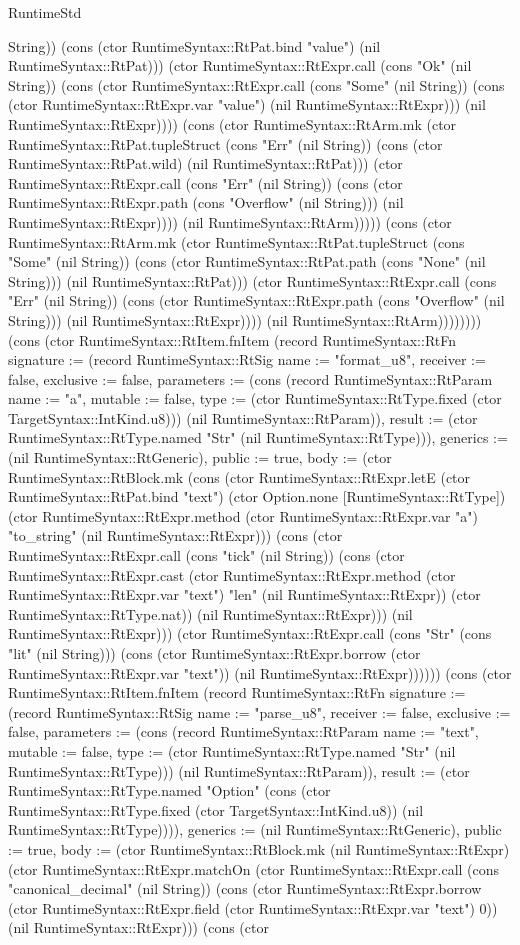 \begin{lexlean}{RuntimeStd}
\begin{semanticmodule}
{String)) (cons (ctor RuntimeSyntax::RtPat.bind "value") (nil RuntimeSyntax::RtPat))) (ctor RuntimeSyntax::RtExpr.call (cons "Ok" (nil String)) (cons (ctor RuntimeSyntax::RtExpr.call (cons "Some" (nil String)) (cons (ctor RuntimeSyntax::RtExpr.var "value") (nil RuntimeSyntax::RtExpr))) (nil RuntimeSyntax::RtExpr)))) (cons (ctor RuntimeSyntax::RtArm.mk (ctor RuntimeSyntax::RtPat.tupleStruct (cons "Err" (nil String)) (cons (ctor RuntimeSyntax::RtPat.wild) (nil RuntimeSyntax::RtPat))) (ctor RuntimeSyntax::RtExpr.call (cons "Err" (nil String)) (cons (ctor RuntimeSyntax::RtExpr.path (cons "Overflow" (nil String))) (nil RuntimeSyntax::RtExpr)))) (nil RuntimeSyntax::RtArm))))) (cons (ctor RuntimeSyntax::RtArm.mk (ctor RuntimeSyntax::RtPat.tupleStruct (cons "Some" (nil String)) (cons (ctor RuntimeSyntax::RtPat.path (cons "None" (nil String))) (nil RuntimeSyntax::RtPat))) (ctor RuntimeSyntax::RtExpr.call (cons "Err" (nil String)) (cons (ctor RuntimeSyntax::RtExpr.path (cons "Overflow" (nil String))) (nil RuntimeSyntax::RtExpr)))) (nil RuntimeSyntax::RtArm))))))})) (cons (ctor RuntimeSyntax::RtItem.fnItem (record RuntimeSyntax::RtFn {signature := (record RuntimeSyntax::RtSig {name := "format_u8", receiver := false, exclusive := false, parameters := (cons (record RuntimeSyntax::RtParam {name := "a", mutable := false, type := (ctor RuntimeSyntax::RtType.fixed (ctor TargetSyntax::IntKind.u8))}) (nil RuntimeSyntax::RtParam)), result := (ctor RuntimeSyntax::RtType.named "Str" (nil RuntimeSyntax::RtType))}), generics := (nil RuntimeSyntax::RtGeneric), public := true, body := (ctor RuntimeSyntax::RtBlock.mk (cons (ctor RuntimeSyntax::RtExpr.letE (ctor RuntimeSyntax::RtPat.bind "text") (ctor Option.none [RuntimeSyntax::RtType]) (ctor RuntimeSyntax::RtExpr.method (ctor RuntimeSyntax::RtExpr.var "a") "to_string" (nil RuntimeSyntax::RtExpr))) (cons (ctor RuntimeSyntax::RtExpr.call (cons "tick" (nil String)) (cons (ctor RuntimeSyntax::RtExpr.cast (ctor RuntimeSyntax::RtExpr.method (ctor RuntimeSyntax::RtExpr.var "text") "len" (nil RuntimeSyntax::RtExpr)) (ctor RuntimeSyntax::RtType.nat)) (nil RuntimeSyntax::RtExpr))) (nil RuntimeSyntax::RtExpr))) (ctor RuntimeSyntax::RtExpr.call (cons "Str" (cons "lit" (nil String))) (cons (ctor RuntimeSyntax::RtExpr.borrow (ctor RuntimeSyntax::RtExpr.var "text")) (nil RuntimeSyntax::RtExpr))))})) (cons (ctor RuntimeSyntax::RtItem.fnItem (record RuntimeSyntax::RtFn {signature := (record RuntimeSyntax::RtSig {name := "parse_u8", receiver := false, exclusive := false, parameters := (cons (record RuntimeSyntax::RtParam {name := "text", mutable := false, type := (ctor RuntimeSyntax::RtType.named "Str" (nil RuntimeSyntax::RtType))}) (nil RuntimeSyntax::RtParam)), result := (ctor RuntimeSyntax::RtType.named "Option" (cons (ctor RuntimeSyntax::RtType.fixed (ctor TargetSyntax::IntKind.u8)) (nil RuntimeSyntax::RtType)))}), generics := (nil RuntimeSyntax::RtGeneric), public := true, body := (ctor RuntimeSyntax::RtBlock.mk (nil RuntimeSyntax::RtExpr) (ctor RuntimeSyntax::RtExpr.matchOn (ctor RuntimeSyntax::RtExpr.call (cons "canonical_decimal" (nil String)) (cons (ctor RuntimeSyntax::RtExpr.borrow (ctor RuntimeSyntax::RtExpr.field (ctor RuntimeSyntax::RtExpr.var "text") 0)) (nil RuntimeSyntax::RtExpr))) (cons (ctor }
\end{semanticmodule}
\end{lexlean}

